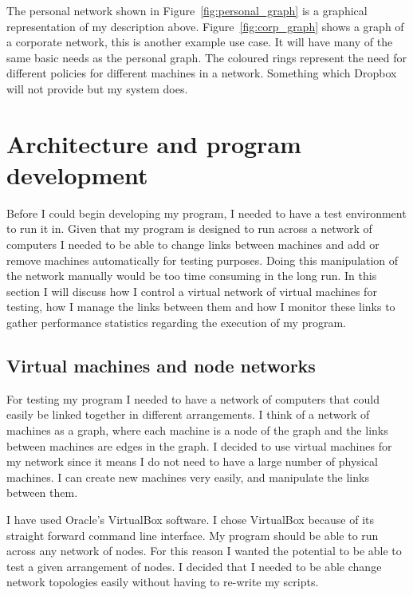 \documentclass[12pt]{article}
\begin{document}
The personal network shown in
Figure~\ref{fig:personal_graph} is a graphical representation
of my description above. Figure~\ref{fig:corp_graph}
shows a graph of a corporate network, this
is another example use case. It will have many of the same
basic needs as the personal graph. The coloured rings represent
the need for different policies for different machines in a network.
Something which Dropbox will not provide but my system does.


\newpage
\section{Architecture and program development}
Before I could begin developing my program, I needed to
have a test environment to run it in. Given that my program
is designed to run across a network of computers I needed
to be able to change links between machines and add or
remove machines automatically for testing purposes.
Doing this manipulation of the network manually would be too time consuming
in the long run. In this section I will discuss how I
control a virtual network of virtual machines for testing, how
I manage the links between them and how I monitor
these links to gather performance statistics regarding the
execution of my program.

\subsection{Virtual machines and node networks}
\label{sec:vm_network}
For testing my program I needed to have a network
of computers that could easily be linked together in different
arrangements. I think of a network of machines as a graph, where
each machine is a node of the graph and the links between machines
are edges in the graph. I decided to use virtual machines for
my network since it means I do not need to have a large number
of physical machines. I can create new machines very easily,
and manipulate the links between them.

I have used Oracle's VirtualBox software. I chose
VirtualBox because of its straight forward command
line interface.
My program should be able to run across
any network of nodes. For this reason I wanted
the potential to be able to test a given arrangement
of nodes.
I decided that I needed to be able change network
topologies easily without having to re-write
my scripts. 
\end{document}
